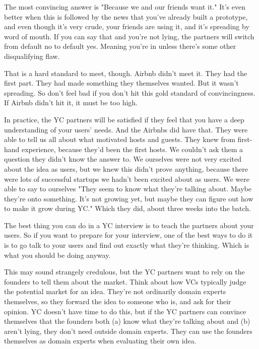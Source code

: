 The most convincing answer
                  is "Because we and our friends want it." It's even better when
                  this is followed by the news that you've already built a
                  prototype, and even though it's very crude, your friends are
                  using it, and it's spreading by word of mouth. If you can say
                  that and you're not lying, the partners will switch from
                  default no to default yes. Meaning you're in unless there's
                  some other disqualifying flaw.

That is a hard
                  standard to meet, though. Airbnb didn't meet it. They had the
                  first part. They had made something they themselves wanted.
                  But it wasn't spreading. So don't feel bad if you don't hit
                  this gold standard of convincingness. If Airbnb didn't hit it,
                  it must be too high.

In practice, the YC partners
                  will be satisfied if they feel that you have a deep
                  understanding of your users' needs. And the Airbnbs did have
                  that. They were able to tell us all about what motivated hosts
                  and guests. They knew from first-hand experience, because
                  they'd been the first hosts. We couldn't ask them a question
                  they didn't know the answer to. We ourselves were not very
                  excited about the idea as users, but we knew this didn't prove
                  anything, because there were lots of successful startups we
                  hadn't been excited about as users. We were able to say to
                  ourselves "They seem to know what they're talking about. Maybe
                  they're onto something. It's not growing yet, but maybe they
                  can figure out how to make it grow during YC." Which they did,
                  about three weeks into the batch.

The best thing
                  you can do in a YC interview is to teach the partners about
                  your users. So if you want to prepare for your interview, one
                  of the best ways to do it is to go talk to your users and find
                  out exactly what they're thinking. Which is what you should be
                  doing anyway.

This may sound strangely credulous,
                  but the YC partners want to rely on the founders to tell them
                  about the market. Think about how VCs typically judge the
                  potential market for an idea. They're not ordinarily domain
                  experts themselves, so they forward the idea to someone who
                  is, and ask for their opinion. YC doesn't have time to do
                  this, but if the YC partners can convince themselves that the
                  founders both (a) know what they're talking about and (b)
                  aren't lying, they don't need outside domain experts. They can
                  use the founders themselves as domain experts when evaluating
                  their own idea.

